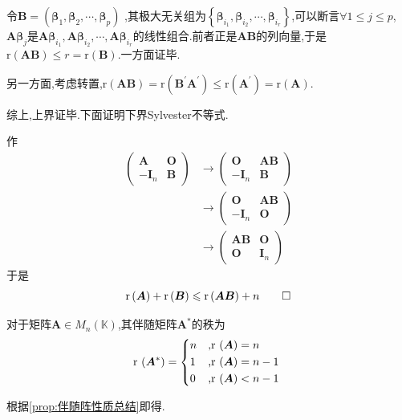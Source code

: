 \begin{formal}
\begin{Proof}
令$\bm{B}=\left(
    \bm{\beta}_1,\bm{\beta}_2,\cdots,\bm{\beta}_p
\right)$
,其极大无关组为$\left\{
    \bm{\beta}_{i_1},\bm{\beta}_{i_2},\cdots,\bm{\beta}_{i_r}
\right\}$,可以断言$\forall 1\leqslant j\leqslant p$,
$\bm{A\beta}_j$是$
    \bm{A\beta}_{i_1},\bm{A\beta}_{i_2},
    \cdots,\bm{A\beta}_{i_r}
$的线性组合.前者正是$\bm{AB}$的列向量,于是
$\mathrm{r}\left(\bm{AB}\right)\leqslant r=\mathrm{r}
\left(\bm{B}\right).$一方面证毕.

另一方面,考虑转置,$\mathrm{r}\left(\bm{AB}\right)=
\mathrm{r}\left(\bm{B}^{\prime}\bm{A}^{\prime}\right)\leqslant 
\mathrm{r}\left(\bm{A}^{\prime}\right)=\mathrm{r}\left(\bm{A}
\right)$.

综上,上界证毕.下面证明下界Sylvester不等式.

作
\begin{align*}
    \begin{pmatrix}
        \bm{A}&\bm{O}\\
        -\bm{I}_n&\bm{B}
    \end{pmatrix}
    &\longrightarrow
    \begin{pmatrix}
        \bm{O}&\bm{AB}\\
        -\bm{I}_n&\bm{B}
    \end{pmatrix}\\
    &\longrightarrow
    \begin{pmatrix}
        \bm{O}&\bm{AB}\\
        -\bm{I}_n&\bm{O}
    \end{pmatrix}\\
    &\longrightarrow
    \begin{pmatrix}
        \bm{AB}&\bm{O}\\
        \bm{O}&\bm{I}_n
    \end{pmatrix}
\end{align*}
于是
\[
\mathrm{r}\left(\bm{A}\right)+\mathrm{r}\left(\bm{B}\right)\leqslant
\mathrm{r}\left(\bm{AB}\right)+n\qedhere
\]
\end{Proof}
\end{formal}
\begin{formal}
\begin{theorem}[伴随阵的秩]\label{thm:伴随阵的秩}
    对于矩阵$\bm{A}\in M_n\left(\mathbb{K}\right)$,其伴随矩阵$\bm{A}^*$的秩为\[
    \mathrm{r}\,\left(\bm{A}^*\right)=\begin{cases*}
    n&,$\mathrm{r}\,\left(\bm{A}\right)=n$\\
    1&,$\mathrm{r}\,\left(\bm{A}\right)=n-1$\\
    0&,$\mathrm{r}\,\left(\bm{A}\right)<n-1$
    \end{cases*}
    \]
\end{theorem}
\begin{Proof}
    根据\cref{prop:伴随阵性质总结}即得.
\end{Proof}
\end{formal}
